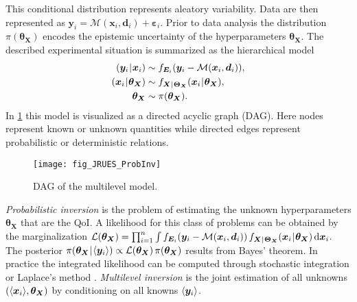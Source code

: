 This conditional distribution represents aleatory variability.
Data are then represented as \(\bm{y}_i = \mathcal{M}(\bm{x}_i,\bm{d}_i) + \bm{\varepsilon}_i\).
Prior to data analysis the distribution \(\pi(\bm{\theta}_{\bm{X}})\) encodes the epistemic uncertainty of the hyperparameters \(\bm{\theta}_{\bm{X}}\).
The described experimental situation is summarized as the hierarchical model
\begin{subequations} \label{eq:Multilevel:Model}
  \begin{align}
    (\bm{y}_i \cond \bm{x}_i) &\sim f_{\bm{E}_i} (\bm{y}_i-\mathcal{M}(\bm{x}_i,\bm{d}_i)), \\
    (\bm{x}_i \cond \bm{\theta}_{\bm{X}}) &\sim f_{\bm{X} \cond \bm{\Theta}_{\bm{X}}} (\bm{x}_i \cond \bm{\theta}_{\bm{X}}), \\
    \bm{\theta}_{\bm{X}} &\sim \pi (\bm{\theta}_{\bm{X}}).
  \end{align}
\end{subequations}
In \cref{fig:DAG} this model is visualized as a directed acyclic graph (DAG).
Here nodes represent known or unknown quantities while directed edges represent probabilistic or deterministic relations.
\begin{figure}[ht]
  \centering
  \texttt{[image: fig\_JRUES\_ProbInv]}
  \caption[DAG of the multilevel model]{DAG of the multilevel model.}
  \label{fig:DAG}
\end{figure}
\par %
\textit{Probabilistic inversion} \cite{Multilevel:Rocquigny2009,Multilevel:Celeux2010,Multilevel:Barbillon2011} is the problem of estimating the unknown hyperparameters \(\bm{\theta}_{\bm{X}}\) that are the QoI.
A likelihood for this class of problems can be obtained by the marginalization
\(\mathcal{L} (\bm{\theta}_{\bm{X}}) = \prod_{i=1}^n \int f_{\bm{E}_i} (\bm{y}_i-\mathcal{M}(\bm{x}_i,\bm{d}_i)) \, f_{\bm{X} {\:\!}|{\:\!} \bm{\Theta}_{\bm{X}}} (\bm{x}_i {\:\!}|{\:\!} \bm{\theta}_{\bm{X}}) \, \mathrm{d} \bm{x}_i\).
The posterior \(\pi(\bm{\theta}_{\bm{X}} {\:\!}|{\:\!} \langle{\bm{y}_i}\rangle) \propto \mathcal{L}(\bm{\theta}_{\bm{X}}) \, \pi(\bm{\theta}_{\bm{X}})\) results from Bayes' theorem.
In practice the integrated likelihood can be computed through stochastic integration \cite{Nagel:IPW2013:Proc} or Laplace's method \cite{Multilevel:Ballesteros2014:Proc}.
\textit{Multilevel inversion} \cite{Nagel:JAIS2015,Nagel:PEM2016} is the joint estimation of all unknowns \((\langle{\bm{x}_i}\rangle,\bm{\theta}_{\bm{X}})\) by conditioning on all knowns \(\langle{\bm{y}_i}\rangle\).
